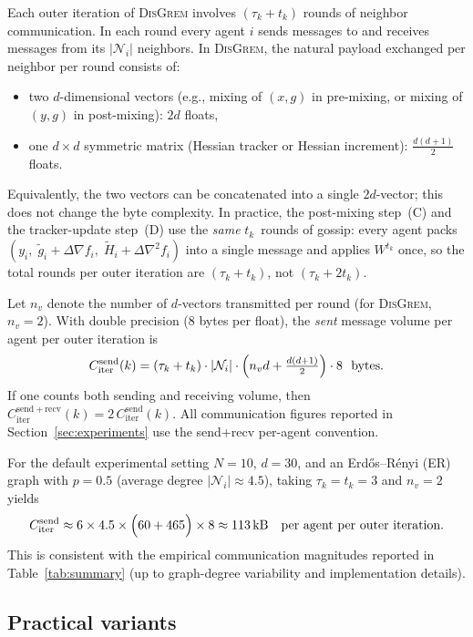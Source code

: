 \documentclass[11pt,a4paper]{article}
\begin{document}
Each outer iteration of \textsc{DisGrem} involves $(\tau_k + t_k)$ rounds of neighbor communication.
In each round every agent $i$ sends messages to and receives messages from its $|\mathcal N_i|$ neighbors.
In \textsc{DisGrem}, the natural payload exchanged per neighbor per round consists of:
\begin{itemize}[leftmargin=1.2em,itemsep=1pt]
	\item two $d$-dimensional vectors (e.g., mixing of $(x,g)$ in pre-mixing, or mixing of $(y,g)$ in post-mixing): $2d$ floats,
	\item one $d\times d$ symmetric matrix (Hessian tracker or Hessian increment): $\tfrac{d(d+1)}{2}$ floats.
\end{itemize}
Equivalently, the two vectors can be concatenated into a single $2d$-vector; this does not change the byte complexity.
In practice, the post-mixing step~(C) and the tracker-update step~(D)
use the \emph{same} $t_k$~rounds of gossip: every agent packs
$(y_i,\; \tilde g_i+\Delta\nabla f_i,\; \tilde H_i+\Delta\nabla^2 f_i)$
into a single message and applies $W^{t_k}$ once, so the total rounds
per outer iteration are $(\tau_k+t_k)$, not $(\tau_k+2t_k)$.

Let $n_v$ denote the number of $d$-vectors transmitted per round (for \textsc{DisGrem}, $n_v=2$).
With double precision (8 bytes per float), the \emph{sent} message volume per agent per outer iteration is
\begin{equation}\label{eq:comm_cost_iter}
	C_{\mathrm{iter}}^{\mathrm{send}}(k)
	= (\tau_k+t_k)\cdot |\mathcal N_i|\cdot \Bigl(n_v d + \tfrac{d(d+1)}{2}\Bigr)\cdot 8 \ \ \text{bytes}.
\end{equation}
If one counts both sending and receiving volume, then
$C_{\mathrm{iter}}^{\mathrm{send+recv}}(k)=2\,C_{\mathrm{iter}}^{\mathrm{send}}(k)$.
All communication figures reported in Section~\ref{sec:experiments}
use the send+recv per-agent convention.

For the default experimental setting $N{=}10$, $d{=}30$, and an Erd\H{o}s--R\'enyi (ER)
graph with $p{=}0.5$ (average degree $|\mathcal N_i|\approx 4.5$),
taking $\tau_k=t_k=3$ and $n_v=2$ yields
\[
C_{\mathrm{iter}}^{\mathrm{send}}\approx 6\times 4.5\times\Bigl(60+465\Bigr)\times 8
\approx 113\,\text{kB}
\quad \text{per agent per outer iteration}.
\]
This is consistent with the empirical communication magnitudes reported in
Table~\ref{tab:summary} (up to graph-degree variability and implementation details).
	
	\subsection{Practical variants}\label{ssec:variants}
	
\end{document}
